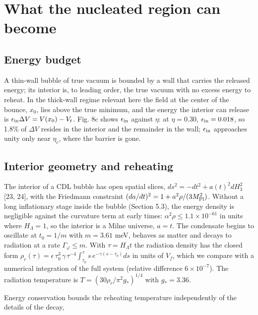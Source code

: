 \documentclass[11pt,a4paper]{article}
\begin{document}
\section{What the nucleated region can become}
\subsection{Energy budget}
A thin-wall bubble of true vacuum is bounded by a wall that carries the released energy; its interior is, to leading order, the true vacuum with no excess energy to reheat. In the thick-wall regime relevant here the field at the center of the bounce, $x_0$, lies above the true minimum, and the energy the interior can release is $\epsilon_{\rm in}\Delta V = V(x_0)-V_t$. Fig. 8c shows $\epsilon_{\rm in}$ against $\eta$: at $\eta=0.30$, $\epsilon_{\rm in}=0.018$, so 1.8\% of $\Delta V$ resides in the interior and the remainder in the wall; $\epsilon_{\rm in}$ approaches unity only near $\eta_c$, where the barrier is gone.

\subsection{Interior geometry and reheating}
The interior of a CDL bubble has open spatial slices, $ds^2=-dt^2+a(t)^2dH_3^2$ [23, 24], with the Friedmann constraint $(da/dt)^2 = 1 + a^2\rho/(3M_{\rm Pl}^2)$. Without a long inflationary stage inside the bubble (Section 5.3), the energy density is negligible against the curvature term at early times: $\alpha^2\rho \le 1.1\times10^{-61}$ in units where $H_\Lambda=1$, so the interior is a Milne universe, $a=t$. The condensate begins to oscillate at $t_0 = 1/m$ with $m = 3.61$ meV, behaves as matter and decays to radiation at a rate $\Gamma_\varphi\le m$. With $\tau=H_\Lambda t$ the radiation density has the closed form $\rho_r(\tau)=\epsilon\,\tau_0^3\,\gamma\,\tau^{-4}\int_{\tau_0}^{\tau}s\,e^{-\gamma(s-\tau_0)}ds$ in units of $V_f$, which we compare with a numerical integration of the full system (relative difference $6\times10^{-7}$). The radiation temperature is $T=(30\rho_r/\pi^2g_*)^{1/4}$ with $g_*=3.36$.

Energy conservation bounds the reheating temperature independently of the details of the decay,
\end{document}
